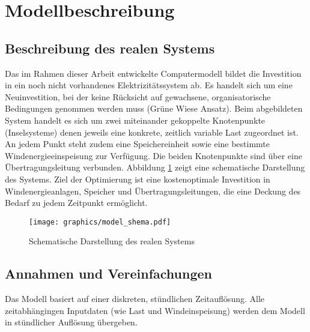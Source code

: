 
\section{Modellbeschreibung} \label{str:modell}

\subsection{Beschreibung des realen Systems} \label{str:reales_system}

Das im Rahmen dieser Arbeit entwickelte Computermodell bildet die Investition in ein noch nicht vorhandenes Elektrizitätssystem ab. Es handelt sich um eine Neuinvestition, bei der keine Rücksicht auf gewachsene, organisatorische Bedingungen genommen werden muss (\glqq Grüne Wiese Ansatz\grqq). Beim abgebildeten System handelt es sich um zwei miteinander gekoppelte Knotenpunkte (Inselsysteme) denen jeweils eine konkrete, zeitlich variable Last zugeordnet ist. An jedem Punkt steht zudem eine Speichereinheit sowie eine bestimmte Windenergieeinspeisung zur Verfügung. Die beiden Knotenpunkte sind über eine Übertragungsleitung verbunden. Abbildung \ref{img:schema} zeigt eine schematische Darstellung des Systems. Ziel der Optimierung ist eine kostenoptimale Investition in Windenergieanlagen, Speicher und Übertragungsleitungen, die eine Deckung des Bedarf zu jedem Zeitpunkt ermöglicht.

\begin{figure}[htbp]
\centering
\texttt{[image: graphics/model\_shema.pdf]}
\caption{Schematische Darstellung des realen Systems}
\label{img:schema}
\end{figure}

\subsection{Annahmen und Vereinfachungen} \label{str:annahmen}

Das Modell basiert auf einer diskreten, stündlichen Zeitauflösung. Alle zeitabhängingen Inputdaten (wie Last und Windeinspeisung) werden dem Modell in stündlicher Auflösung übergeben. 

